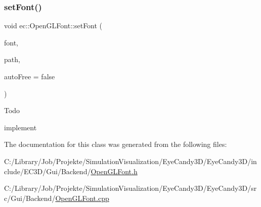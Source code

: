 \subsubsection{\texorpdfstring{set\+Font()}{setFont()}}
{\footnotesize\ttfamily void ec\+::\+Open\+G\+L\+Font\+::set\+Font (\begin{DoxyParamCaption}\item[{\mbox{\hyperlink{classec_1_1_font_texture_atlas}{ec\+::\+Font\+Texture\+Atlas}} $\ast$}]{font,  }\item[{const std\+::string \&}]{path,  }\item[{bool}]{auto\+Free = {\ttfamily false} }\end{DoxyParamCaption})\hspace{0.3cm}{\ttfamily [virtual]}}

\begin{DoxyRefDesc}{Todo}
\item[\mbox{\hyperlink{todo__todo000008}{Todo}}]implement \end{DoxyRefDesc}


The documentation for this class was generated from the following files\+:\begin{DoxyCompactItemize}
\item 
C\+:/\+Library/\+Job/\+Projekte/\+Simulation\+Visualization/\+Eye\+Candy3\+D/\+Eye\+Candy3\+D/include/\+E\+C3\+D/\+Gui/\+Backend/\mbox{\hyperlink{_open_g_l_font_8h}{Open\+G\+L\+Font.\+h}}\item 
C\+:/\+Library/\+Job/\+Projekte/\+Simulation\+Visualization/\+Eye\+Candy3\+D/\+Eye\+Candy3\+D/src/\+Gui/\+Backend/\mbox{\hyperlink{_open_g_l_font_8cpp}{Open\+G\+L\+Font.\+cpp}}\end{DoxyCompactItemize}
